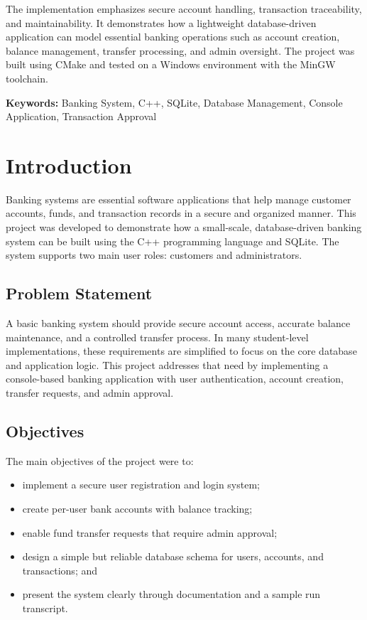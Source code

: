 \documentclass[12pt,a4paper]{report}
\begin{document}
The implementation emphasizes secure account handling, transaction traceability, and maintainability. It demonstrates how a lightweight database-driven application can model essential banking operations such as account creation, balance management, transfer processing, and admin oversight. The project was built using CMake and tested on a Windows environment with the MinGW toolchain.

\noindent\textbf{Keywords:} Banking System, C++, SQLite, Database Management, Console Application, Transaction Approval

\cleardoublepage
\tableofcontents
\listoffigures
\listoftables

\cleardoublepage
{}

\chapter{Introduction}
Banking systems are essential software applications that help manage customer accounts, funds, and transaction records in a secure and organized manner. This project was developed to demonstrate how a small-scale, database-driven banking system can be built using the C++ programming language and SQLite. The system supports two main user roles: customers and administrators.

\section{Problem Statement}
A basic banking system should provide secure account access, accurate balance maintenance, and a controlled transfer process. In many student-level implementations, these requirements are simplified to focus on the core database and application logic. This project addresses that need by implementing a console-based banking application with user authentication, account creation, transfer requests, and admin approval.

\section{Objectives}
The main objectives of the project were to:
\begin{itemize}
  \item implement a secure user registration and login system;
  \item create per-user bank accounts with balance tracking;
  \item enable fund transfer requests that require admin approval;
  \item design a simple but reliable database schema for users, accounts, and transactions; and
  \item present the system clearly through documentation and a sample run transcript.
\end{itemize}
\end{document}
